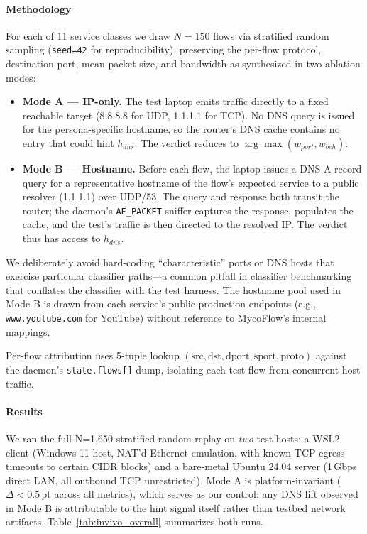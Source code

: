 \documentclass[journal,onecolumn]{IEEEtran}
\begin{document}
\paragraph{Methodology}
For each of 11 service classes we draw $N=150$ flows via stratified random
sampling (\texttt{seed=42} for reproducibility), preserving the
per-flow protocol, destination port, mean packet size, and bandwidth as
synthesized in two ablation modes:

\begin{itemize}
\item \textbf{Mode A — IP-only.} The test laptop emits traffic directly
to a fixed reachable target (8.8.8.8 for UDP, 1.1.1.1 for TCP). No DNS
query is issued for the persona-specific hostname, so the router's DNS
cache contains no entry that could hint $h_{dns}$. The verdict reduces to
$\arg\max(w_{port}, w_{beh})$.
\item \textbf{Mode B — Hostname.} Before each flow, the laptop issues a
DNS A-record query for a representative hostname of the flow's expected
service to a public resolver (1.1.1.1) over UDP/53. The query and response
both transit the router; the daemon's \texttt{AF\_PACKET} sniffer captures
the response, populates the cache, and the test's traffic is then directed
to the resolved IP. The verdict thus has access to $h_{dns}$.
\end{itemize}

We deliberately avoid hard-coding ``characteristic'' ports or DNS hosts
that exercise particular classifier paths—a common pitfall in classifier
benchmarking that conflates the classifier with the test harness. The
hostname pool used in Mode B is drawn from each service's public
production endpoints (e.g., \texttt{www.youtube.com} for YouTube) without
reference to MycoFlow's internal mappings.

Per-flow attribution uses 5-tuple lookup
$(\text{src}, \text{dst}, \text{dport}, \text{sport}, \text{proto})$
against the daemon's \texttt{state.flows[]} dump, isolating each test flow
from concurrent host traffic.

\paragraph{Results}
We ran the full N=1{,}650 stratified-random replay on \emph{two} test
hosts: a WSL2 client (Windows 11 host, NAT'd Ethernet emulation, with
known TCP egress timeouts to certain CIDR blocks) and a bare-metal
Ubuntu 24.04 server (1\,Gbps direct LAN, all outbound TCP unrestricted).
Mode A is platform-invariant ($\Delta < 0.5$\,pt across all metrics),
which serves as our control: any DNS lift observed in Mode B is
attributable to the hint signal itself rather than testbed network
artifacts. Table~\ref{tab:invivo_overall} summarizes both runs.
\end{document}

